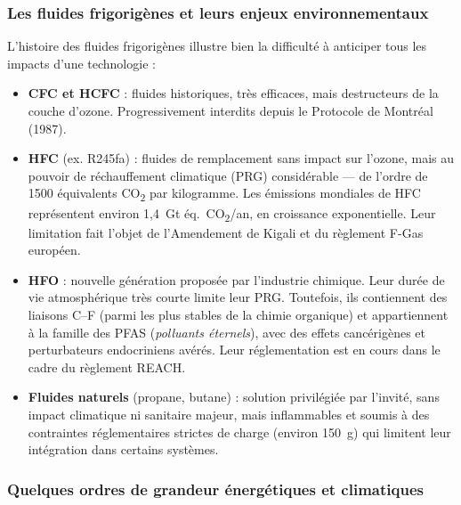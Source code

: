 \subsubsection{Les fluides frigorigènes et leurs enjeux environnementaux}

L'histoire des fluides frigorigènes illustre bien la difficulté à anticiper tous les impacts d'une technologie :

\begin{itemize}
    \item \textbf{CFC et HCFC} : fluides historiques, très efficaces, mais destructeurs de la couche d'ozone. Progressivement interdits depuis le Protocole de Montréal (1987).
    \item \textbf{HFC} (ex. R245fa) : fluides de remplacement sans impact sur l'ozone, mais au pouvoir de réchauffement climatique (PRG) considérable --- de l'ordre de 1500 équivalents CO\textsubscript{2} par kilogramme. Les émissions mondiales de HFC représentent environ 1,4~Gt éq.~CO\textsubscript{2}/an, en croissance exponentielle. Leur limitation fait l'objet de l'Amendement de Kigali et du règlement F-Gas européen.
    \item \textbf{HFO} : nouvelle génération proposée par l'industrie chimique. Leur durée de vie atmosphérique très courte limite leur PRG. Toutefois, ils contiennent des liaisons C--F (parmi les plus stables de la chimie organique) et appartiennent à la famille des PFAS (\textit{polluants éternels}), avec des effets cancérigènes et perturbateurs endocriniens avérés. Leur réglementation est en cours dans le cadre du règlement REACH.
    \item \textbf{Fluides naturels} (propane, butane) : solution privilégiée par l'invité, sans impact climatique ni sanitaire majeur, mais inflammables et soumis à des contraintes réglementaires strictes de charge (environ 150~g) qui limitent leur intégration dans certains systèmes.
\end{itemize}

\subsubsection{Quelques ordres de grandeur énergétiques et climatiques}

